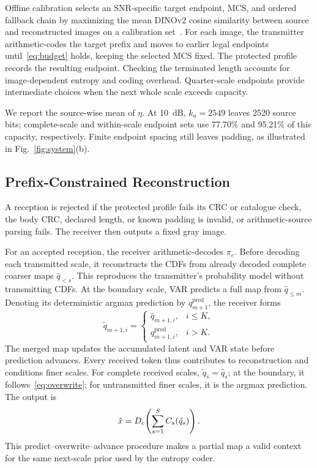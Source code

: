 Offline calibration selects an SNR-specific target endpoint, MCS, and ordered fallback chain by maximizing the mean DINOv2 cosine similarity between source and reconstructed images on a calibration set~\cite{dinov2}. For each image, the transmitter arithmetic-codes the target prefix and moves to earlier legal endpoints until~\eqref{eq:budget} holds, keeping the selected MCS fixed. The protected profile records the resulting endpoint. Checking the terminated length accounts for image-dependent entropy and coding overhead. Quarter-scale endpoints provide intermediate choices when the next whole scale exceeds capacity.

We report the source-wise mean of $\eta$. At 10~dB, $k_a=2549$ leaves 2520 source bits; complete-scale and within-scale endpoint sets use 77.70\% and 95.21\% of this capacity, respectively. Finite endpoint spacing still leaves padding, as illustrated in Fig.~\ref{fig:system}(b).

\subsection{Prefix-Constrained Reconstruction}
A reception is rejected if the protected profile fails its CRC or catalogue check, the body CRC, declared length, or known padding is invalid, or arithmetic-source parsing fails. The receiver then outputs a fixed gray image.

For an accepted reception, the receiver arithmetic-decodes $\pi_e$. Before decoding each transmitted scale, it reconstructs the CDFs from already decoded complete coarser maps $\hat q_{<s}$. This reproduces the transmitter's probability model without transmitting CDFs. At the boundary scale, VAR predicts a full map from $\hat q_{\leq m}$. Denoting its deterministic argmax prediction by $q^{\mathrm{pred}}_{m+1}$, the receiver forms
\begin{equation}
 \tilde q_{m+1,i}=\begin{cases}
 \hat q_{m+1,i},&i\leq K,\\
 q^{\mathrm{pred}}_{m+1,i},&i>K.
 \end{cases}
 \label{eq:overwrite}
\end{equation}
The merged map updates the accumulated latent and VAR state before prediction advances. Every received token thus contributes to reconstruction and conditions finer scales. For complete received scales, $\tilde q_s=\hat q_s$; at the boundary, it follows~\eqref{eq:overwrite}; for untransmitted finer scales, it is the argmax prediction. The output is
\begin{equation}
 \hat x=D_c\!\left(\sum_{s=1}^S C_s(\tilde q_s)\right).
 \label{eq:reconstruction}
\end{equation}
This predict--overwrite--advance procedure makes a partial map a valid context for the same next-scale prior used by the entropy coder.
